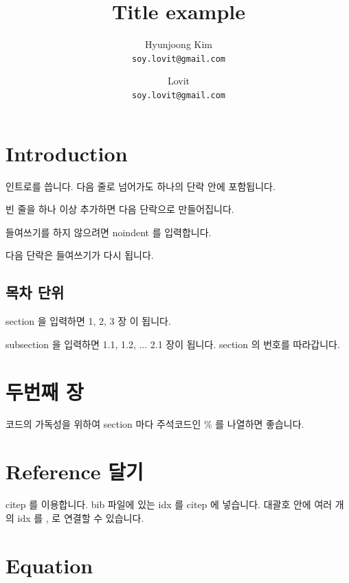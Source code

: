 \documentclass[11pt]{article}
\begin{document}
\title{Title example}
\author{
  Hyunjoong Kim\\
  \texttt{soy.lovit@gmail.com}
  \and
  Lovit\\
  \texttt{soy.lovit@gmail.com}
}

\maketitle
\smallskip

\section{Introduction}

인트로를 씁니다.
다음 줄로 넘어가도 하나의 단락 안에 포함됩니다.

빈 줄을 하나 이상 추가하면 다음 단락으로 만들어집니다.

\noindent
들여쓰기를 하지 않으려면 noindent 를 입력합니다.

다음 단락은 들여쓰기가 다시 됩니다.

\subsection{목차 단위}

section 을 입력하면 1, 2, 3 장 이 됩니다.

subsection 을 입력하면 1.1, 1.2, ... 2.1 장이 됩니다. section 의 번호를 따라갑니다.

\section{두번째 장}

코드의 가독성을 위하여 section 마다 주석코드인 \% 를 나열하면 좋습니다.

\section{Reference 달기}

citep 를 이용합니다. bib 파일에 있는 idx 를 citep 에 넣습니다. \citep{jain2010data} 대괄호 안에 여러 개의 idx 를 , 로 연결할 수 있습니다.

\section{Equation}
\end{document}
